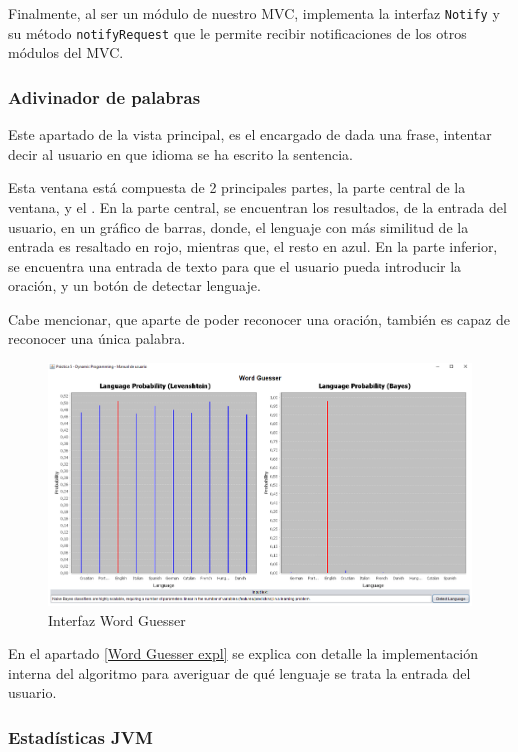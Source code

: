 Finalmente, al ser un módulo de nuestro MVC, implementa la interfaz \texttt{Notify} y su método \texttt{notifyRequest} que le permite recibir notificaciones de los otros módulos del MVC.

\subsubsection{Adivinador de palabras}\label{Word Guesser}

Este apartado de la vista principal, es el encargado de dada una frase, intentar decir al usuario en que idioma se ha escrito la sentencia.\bigskip

Esta ventana está compuesta de 2 principales partes, la parte central de la ventana, y el . En la parte central, se encuentran los resultados, de la entrada del usuario, en un gráfico de barras, donde, el lenguaje con más similitud de la entrada es resaltado en rojo, mientras que, el resto en azul. En la parte inferior, se encuentra una entrada de texto para que el usuario pueda introducir la oración, y un botón de detectar lenguaje.\bigskip

Cabe mencionar, que aparte de poder reconocer una oración, también es capaz de reconocer una única palabra.

\begin{figure}[!h]
    \centering
    \includegraphics[width=\linewidth]{MVC/View/img/word-guesser.png}
    \caption{Interfaz Word Guesser}
    \label{fig:Ejemplo Word Guesser}
\end{figure}

En el apartado \ref{Word Guesser expl} se explica con detalle la implementación interna del algoritmo para averiguar de qué lenguaje se trata la entrada del usuario.

\subsubsection{Estadísticas JVM}\label{Stats JVM}

